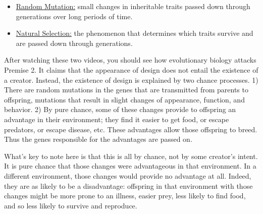 \documentclass[]{article}
\begin{document}
\begin{itemize}
\itemsep1pt\parskip0pt
\item
  \href{https://www.youtube.com/watch?v=GhHOjC4oxh8}{Random Mutation:}
  small changes in inheritable traits passed down through generations
  over long periods of time.
\item
  \href{https://www.youtube.com/watch?v=0SCjhI86grU}{Natural Selection:}
  the phenomenon that determines which traits survive and are passed
  down through generations.
\end{itemize}

After watching these two videos, you should see how evolutionary biology
attacks Premise 2. It claims that the appearance of design does not
entail the existence of a creator. Instead, the existence of design is
explained by two chance processes. 1) There are random mutations in the
genes that are transmitted from parents to offspring, mutations that
result in slight changes of appearance, function, and behavior. 2) By
pure chance, some of these changes provide to offspring an advantage in
their environment; they find it easier to get food, or escape predators,
or escape disease, etc. These advantages allow those offspring to breed.
Thus the genes responsible for the advantages are passed on.

What's key to note here is that this is all by chance, not by some
creator's intent. It is pure chance that those changes were advantageous
in that environment. In a different environment, those changes would
provide no advantage at all. Indeed, they are as likely to be a
disadvantage: offspring in that environment with those changes might be
more prone to an illness, easier prey, less likely to find food, and so
less likely to survive and reproduce.
\end{document}
